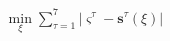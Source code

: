     \begin{equation}\begin{gathered}\begin{aligned}
      \min_{\xi} \sum_{\tau=1}^{7} |\varsigma^{\tau} -\mathbf{s}^{\tau}(\xi)|  \label{eq:naivePowell}
    \end{aligned}\end{gathered}\end{equation}
  
